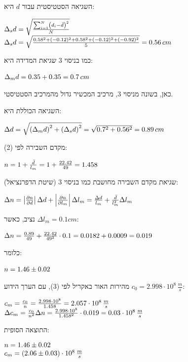 \documentclass[14pt]{extarticle}
\makeatletter
\newenvironment{lefteqs}{%
    \begin{english}%
    \begin{flushleft}%
    \renewcommand{\arraystretch}{1.3}%
    $\begin{array}{@{}l@{}}%
}{%
    \end{array}$%
    \end{flushleft}%
    \end{english}%
}
\makeatother
\begin{document}
השגיאה הסטטיסטית עבור $d$ היא:
\begin{lefteqs}
    \Delta_s d = \sqrt{\frac{\sum_{i=1}^{N}\left(d_i - \bar{d}\right)^2}{N}} \\
    \Delta_s d = \sqrt{\frac{0.58^2 + (-0.12)^2 + 0.58^2 + (-0.12)^2 + (-0.92)^2}{5}} = 0.56\,cm
\end{lefteqs}

כמו בניסוי 3 שגיאת המדידה היא:
\begin{lefteqs}
    \Delta_m d = 0.35 + 0.35 = 0.7\,cm
\end{lefteqs}
כאן, בשונה מניסוי 3, מרכיב המכשיר גדול מהמרכיב הסטטיסטי.

השגיאה הכוללת היא:
\begin{lefteqs}
    \Delta d = \sqrt{\left(\Delta_m d\right)^2 + \left(\Delta_s d\right)^2} = \sqrt{0.7^2 + 0.56^2} = 0.89\,cm
\end{lefteqs}

מקדם השבירה לפי (2):
\begin{lefteqs}
    n = 1 + \frac{\bar{d}}{l_m} = 1 + \frac{22.42}{49} = 1.458
\end{lefteqs}

שגיאת מקדם השבירה מחושבת כמו בניסוי 3 (שיטת הדפרנציאל):
\begin{lefteqs}
    \Delta n = \left| \frac{\partial n}{\partial d} \right| \Delta d + \left| \frac{\partial n}{\partial l_m} \right| \Delta l_m
    = \frac{\Delta d}{l_m} + \frac{\bar{d}}{l_m^2} \Delta l_m
\end{lefteqs}
נציב, כאשר $\Delta l_m = 0.1cm$:
\begin{lefteqs}
    \Delta n = \frac{0.89}{49} + \frac{22.42}{49^2} \cdot 0.1 = 0.0182 + 0.0009 = 0.019
\end{lefteqs}
כלומר:
\begin{lefteqs}
    n = 1.46 \pm 0.02
\end{lefteqs}

מהירות האור באקריל לפי (3), עם הערך הידוע $c_0 = 2.998 \cdot 10^8\,\frac{m}{s}$:
\begin{lefteqs}
    c_m = \frac{c_0}{n} = \frac{2.998 \cdot 10^8}{1.458} = 2.057 \cdot 10^8\,\frac{m}{s} \\
    \Delta c_m = \frac{c_0}{n^2} \Delta n = \frac{2.998 \cdot 10^8}{1.458^2} \cdot 0.019 = 0.03 \cdot 10^8\,\frac{m}{s}
\end{lefteqs}

התוצאה הסופית:
\begin{lefteqs}
    n = 1.46 \pm 0.02 \\
    c_m = (2.06 \pm 0.03) \cdot 10^8\,\frac{m}{s}
\end{lefteqs}
\end{document}
